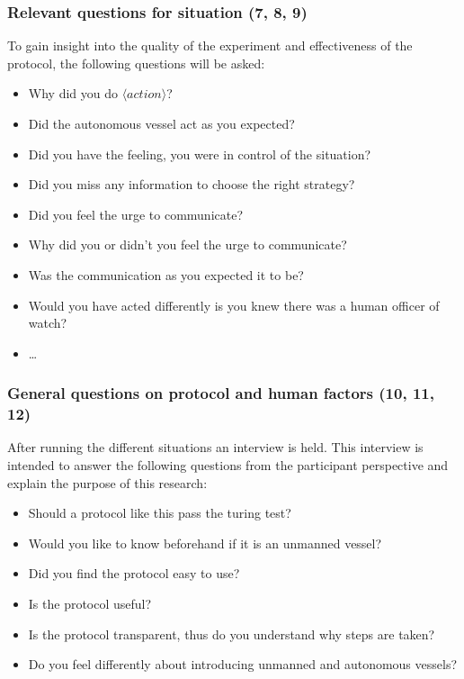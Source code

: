 \subsubsection{Relevant questions for situation (7, 8, 9)}
To gain insight into the quality of the experiment and effectiveness of the protocol, the following questions will be asked:
\begin{itemize}
	\item Why did you do $\langle action \rangle$?
	\item Did the autonomous vessel act as you expected?
	\item Did you have the feeling, you were in control of the situation?
	\item Did you miss any information to choose the right strategy?
	\item Did you feel the urge to communicate?
	\item Why did you or didn't you feel the urge to communicate?
	\item Was the communication as you expected it to be?
	\item Would you have acted differently is you knew there was a human officer of watch?
	\item \dots {}
\end{itemize}

\subsubsection{General questions on protocol and human factors (10, 11, 12)}
After running the different situations an interview is held. This interview is intended to answer the following questions from the participant perspective and explain the purpose of this research:
\begin{itemize}
	\item Should a protocol like this pass the turing test?
	\item Would you like to know beforehand if it is an unmanned vessel?
	\item Did you find the protocol easy to use?
	\item Is the protocol useful?
	\item Is the protocol transparent, thus do you understand why steps are taken?
	\item Do you feel differently about introducing unmanned and autonomous vessels?
\end{itemize}

